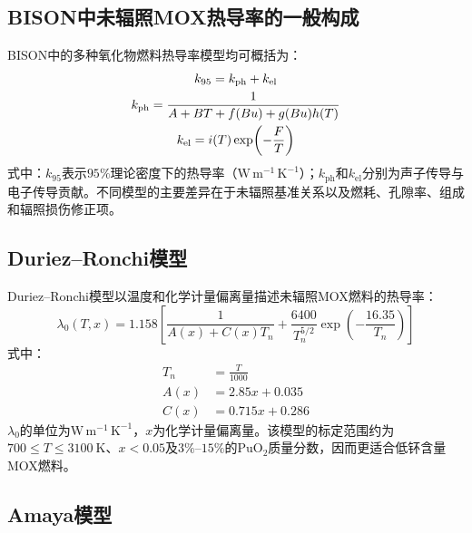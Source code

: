 \subsection{BISON中未辐照MOX热导率的一般构成}

BISON中的多种氧化物燃料热导率模型均可概括为：
\begin{gather}
	k_{95}=k_{\mathrm{ph}}+k_{\mathrm{el}}
	\notag
	\\
	k_{\mathrm{ph}}
	=\frac{1}{A+BT+f(Bu)+g(Bu)h(T)}
	\notag
	\\
	k_{\mathrm{el}}
	=i(T)\exp\!\left(-\frac{F}{T}\right)
	\label{eq:appendix_bison_thermal_conductivity_general}
\end{gather}
\label{eq:appendix_bison_k95}
\label{eq:appendix_bison_phonon}
\label{eq:appendix_bison_electronic}
\noindent 式中：$k_{95}$表示$95\%$理论密度下的热导率（$\mathrm{W\,m^{-1}\,K^{-1}}$）；$k_{\mathrm{ph}}$和$k_{\mathrm{el}}$分别为声子传导与电子传导贡献。不同模型的主要差异在于未辐照基准关系以及燃耗、孔隙率、组成和辐照损伤修正项。

\subsection{Duriez--Ronchi模型}

Duriez--Ronchi模型以温度和化学计量偏离量描述未辐照MOX燃料的热导率：
\begin{equation}
	\lambda_0(T,x)=1.158
	\left[
	\frac{1}{A(x)+C(x)T_n}
	+\frac{6400}{T_n^{5/2}}
	\exp\!\left(-\frac{16.35}{T_n}\right)
	\right]
	\label{eq:appendix_duriez_ronchi}
\end{equation}
\noindent 式中：
\begin{equation}
	\begin{aligned}
		T_n&=\frac{T}{1000}\\
		A(x)&=2.85x+0.035\\
		C(x)&=0.715x+0.286
	\end{aligned}
	\label{eq:appendix_duriez_parameters}
\end{equation}
\label{eq:appendix_duriez_reduced_temperature}
\label{eq:appendix_duriez_A}
\label{eq:appendix_duriez_C}
$\lambda_0$的单位为$\mathrm{W\,m^{-1}\,K^{-1}}$，$x$为化学计量偏离量。该模型的标定范围约为$700\leq T\leq3100\ \mathrm{K}$、$x<0.05$及$3\%$--$15\%$的$\mathrm{PuO}_2$质量分数，因而更适合低钚含量MOX燃料。

\subsection{Amaya模型}

